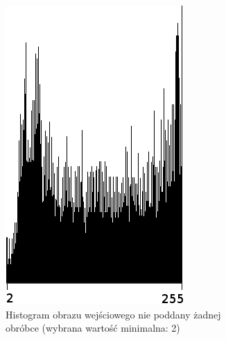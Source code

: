 \begin{figure}
  \centering
  \begin{subfigure}[b]{0.45\textwidth}
    \includegraphics[width=\textwidth]{img/research-min-histogram-bad-histogram}
    \caption{Histogram obrazu wejściowego nie poddany żadnej obróbce (wybrana wartość minimalna: 2)}
    \label{fig:research_min_histogram_bad_histogram}
  \end{subfigure}
~
  \begin{subfigure}[b]{0.45\textwidth}

\end{subfigure}
\end{figure}
